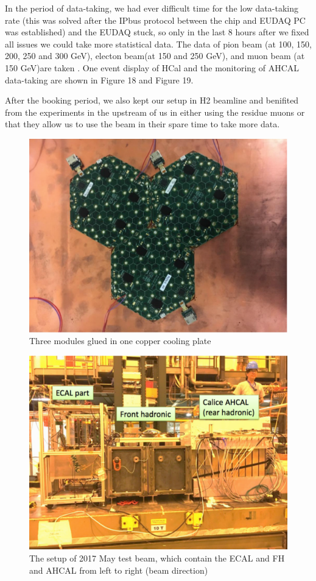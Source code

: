 \documentclass{article}
\begin{document}
In the period of data-taking, we had ever difficult time for the low data-taking rate (this was solved after the IPbus protocol between the chip and EUDAQ PC was established) and the EUDAQ stuck, so only in the last 8 hours after we fixed all issues we could take more statistical data. The data of pion beam (at 100, 150, 200, 250 and 300 GeV), electon beam(at 150 and 250 GeV), and muon beam (at 150 GeV)are taken \cite{July 2017 TB google doc}. One event display of HCal and the monitoring of AHCAL data-taking are shown in Figure 18 and Figure 19.   

After the booking period, we also kept our setup in H2 beamline and benifited from the experiments in the upstream of us in either using the residue muons or that they allow us to use the beam in their spare time to take more data.  


\begin{figure}
\centering
\includegraphics[width=.7\textwidth]{figures/2017JulyTestBeam_3moduleForFH.pdf}
\caption{Three modules glued in one copper cooling plate}
\label{pics:blablabla}
\end{figure}

\begin{figure}
\centering
\includegraphics[width=.7\textwidth]{figures/2017JulyTestBeam_setup1.pdf}
\caption{The setup of 2017 May test beam, which contain the ECAL and FH and AHCAL from left to right (beam direction)}
\label{pics:blablabla}
\end{figure}
\end{document}

